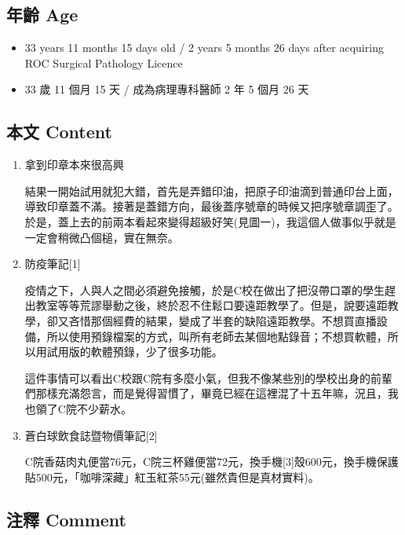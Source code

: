\documentclass[a5paper, 12pt
]{book}
\providecommand{\tightlist}{%
  \setlength{\itemsep}{0pt}\setlength{\parskip}{0pt}}
\begin{document}
\hypertarget{ux5e74ux9f61-age-37}{%
\subsection{年齡 Age}\label{ux5e74ux9f61-age-37}}

\begin{itemize}
\tightlist
\item
  33 years 11 months 15 days old / 2 years 5 months 26 days after
  acquiring ROC Surgical Pathology Licence
\item
  33 歲 11 個月 15 天 / 成為病理專科醫師 2 年 5 個月 26 天
\end{itemize}

\hypertarget{ux672cux6587-content-37}{%
\subsection{本文 Content}\label{ux672cux6587-content-37}}

\begin{enumerate}
\def\labelenumi{\arabic{enumi}.}
\item
  拿到印章本來很高興

  結果一開始試用就犯大錯，首先是弄錯印油，把原子印油滴到普通印台上面，導致印章蓋不滿。接著是蓋錯方向，最後蓋序號章的時候又把序號章調歪了。於是，蓋上去的前兩本看起來變得超級好笑(見圖一)，我這個人做事似乎就是一定會稍微凸個槌，實在無奈。
\item
  防疫筆記{[}1{]}

  疫情之下，人與人之間必須避免接觸，於是C校在做出了把沒帶口罩的學生趕出教室等等荒謬舉動之後，終於忍不住鬆口要遠距教學了。但是，說要遠距教學，卻又吝惜那個經費的結果，變成了半套的缺陷遠距教學。不想買直播設備，所以使用預錄檔案的方式，叫所有老師去某個地點錄音；不想買軟體，所以用試用版的軟體預錄，少了很多功能。

  這件事情可以看出C校跟C院有多麼小氣，但我不像某些別的學校出身的前輩們那樣充滿怨言，而是覺得習慣了，畢竟已經在這裡混了十五年嘛，況且，我也領了C院不少薪水。
\item
  蒼白球飲食誌暨物價筆記{[}2{]}

  C院香菇肉丸便當76元，C院三杯雞便當72元，換手機{[}3{]}殼600元，換手機保護貼500元，「咖啡深藏」紅玉紅茶55元(雖然貴但是真材實料)。
\end{enumerate}

\hypertarget{ux6ce8ux91cb-comment-37}{%
\subsection{注釋 Comment}\label{ux6ce8ux91cb-comment-37}}
\end{document}
